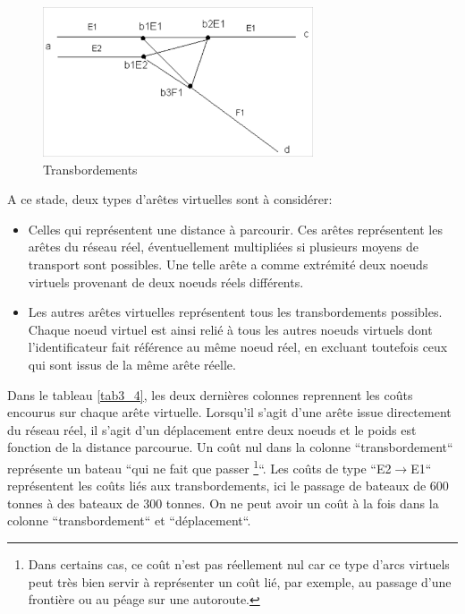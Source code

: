 \begin{figure}[htbp]
\centerline{\includegraphics[width=8cm]{f3_5.png}}
\caption{\label{f3_5} Transbordements}
\end{figure}





A ce stade, deux types d'arêtes virtuelles sont à considérer:

\begin{itemize}
\item Celles qui représentent une distance à parcourir. Ces arêtes
représentent les arêtes du réseau réel, éventuellement multipliées
si plusieurs moyens de transport sont possibles. Une telle arête a
comme extrémité deux noeuds virtuels provenant de deux noeuds réels
différents.
\item Les autres arêtes virtuelles représentent tous les transbordements
possibles. Chaque noeud virtuel est ainsi relié à tous les autres
noeuds virtuels dont l'identificateur fait référence au même noeud
réel, en excluant toutefois ceux qui sont issus de la même arête
réelle.
\end{itemize}

Dans le tableau \ref{tab3_4}, les deux dernières colonnes reprennent les coûts
encourus sur chaque arête virtuelle. Lorsqu'il s'agit d'une arête issue
directement du réseau réel, il s'agit d'un déplacement entre deux noeuds et le
poids est fonction de la distance parcourue. Un coût nul dans la colonne
 ``transbordement`` représente un bateau ``qui ne fait que passer
\footnote{Dans certains cas, ce coût n'est pas réellement nul car ce type
d'arcs virtuels peut très bien servir  à représenter un coût lié,
par exemple, au passage d'une frontière ou au péage sur une
autoroute.}``. Les coûts de type ``E2$\rightarrow$E1`` représentent
les coûts liés aux transbordements, ici le passage de bateaux de
600 tonnes à des bateaux de 300 tonnes. On ne peut avoir un coût à
la fois dans la colonne ``transbordement`` et ``déplacement``.


